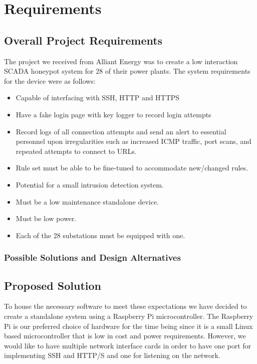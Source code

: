 \chapter{Requirements}

\section{Overall Project Requirements}

The project we received from Alliant Energy was to create a low interaction SCADA honeypot system for 28 of their power plants.  The system requirements for the device were as follows:

\begin{itemize}
    \item Capable of interfacing with SSH, HTTP and HTTPS
    \item Have a fake login page with key logger to record login attempts 
    \item Record logs of all connection attempts and send an alert to essential personnel upon irregularities such as increased ICMP traffic, port scans, and repeated attempts to connect to URLs.
    \item Rule set must be able to be fine-tuned to accommodate new/changed rules.
    \item Potential for a small intrusion detection system.
    \item Must be a low maintenance standalone device.
    \item Must be low power.
    \item Each of the 28 substations must be equipped with one.
\end{itemize}

\subsection{Possible Solutions and Design Alternatives}

\section{Proposed Solution}

To house the necessary software to meet these expectations we have decided to create a standalone system using a Raspberry Pi
microcontroller.  The Raspberry Pi is our preferred choice of hardware for the time being since it is a small Linux based
microcontroller that is low in cost and power requirements.  However, we would like to have multiple network interface cards in
order to have one port for implementing SSH and HTTP/S and one for listening on the network.

